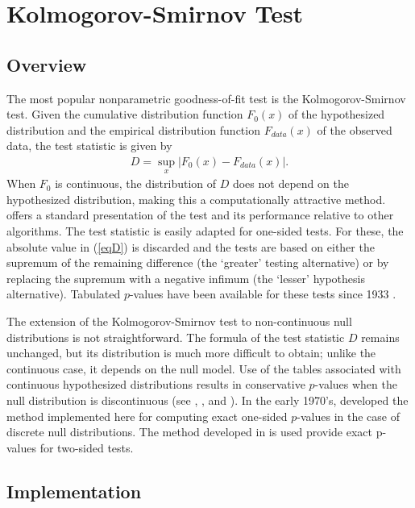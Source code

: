\section{Kolmogorov-Smirnov Test}

\subsection{Overview}

The most popular nonparametric goodness-of-fit test is the
Kolmogorov-Smirnov test.
Given the cumulative distribution
function $F_0(x)$ of the hypothesized distribution
and the empirical distribution function $F_{data}(x)$ of the
observed data,  the test statistic is given by
\begin{align}
D = \sup_x \left| F_0(x)- F_{data}(x) \right|.    \label{eqD}
\end{align}
When $F_0$ is continuous, 
the distribution of $D$ does not depend on the hypothesized
distribution, making this a computationally
attractive method. \cite{slakter1965} offers a standard presentation
of the test and its
performance relative to other algorithms. 
The test statistic is easily adapted for one-sided tests.
For these, the absolute value in (\ref{eqD}) is discarded and the tests are based
on either the supremum of the remaining difference (the `greater' testing
alternative) or by replacing the supremum with a negative infimum
(the `lesser' hypothesis alternative).  Tabulated $p$-values have been
available for these tests since 1933 \citep{kol33}.

The extension of the Kolmogorov-Smirnov test to non-continuous 
null distributions is not straightforward. The formula of
the test statistic $D$ remains unchanged, but its distribution
is much more difficult to obtain; unlike the 
continuous case, it depends on the null model.
Use of the tables associated
with continuous hypothesized distributions results in conservative $p$-values
when the null distribution is discontinuous 
(see \cite{slakter1965}, \cite{goodman1954}, and \cite{massey1951}).  
In the early 1970's, 
\citet{Conover1972} developed the method implemented here
for computing exact one-sided $p$-values
in the case of discrete null distributions.
The method developed in \citet{gleser85} is used provide exact p-values
for two-sided tests.

\subsection{Implementation}

